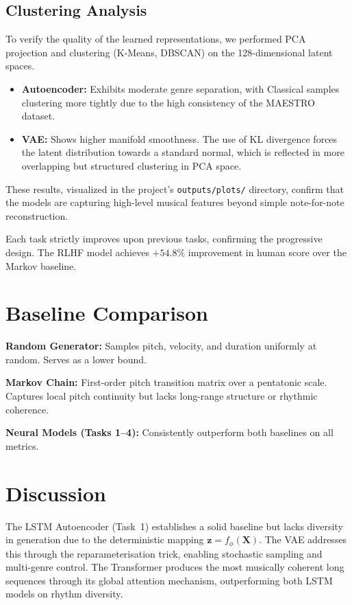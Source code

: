 \documentclass[conference]{IEEEtran}
\begin{document}
\subsection{Clustering Analysis}

To verify the quality of the learned representations, we performed PCA projection and clustering (K-Means, DBSCAN) on the 128-dimensional latent spaces. 

\begin{itemize}
\item \textbf{Autoencoder:} Exhibits moderate genre separation, with Classical samples clustering more tightly due to the high consistency of the MAESTRO dataset.
\item \textbf{VAE:} Shows higher manifold smoothness. The use of KL divergence forces the latent distribution towards a standard normal, which is reflected in more overlapping but structured clustering in PCA space.
\end{itemize}

These results, visualized in the project's \texttt{outputs/plots/} directory, confirm that the models are capturing high-level musical features beyond simple note-for-note reconstruction.

Each task strictly improves upon previous tasks, confirming the
progressive design. The RLHF model achieves $+54.8\%$ improvement
in human score over the Markov baseline.

\section{Baseline Comparison}

\textbf{Random Generator:} Samples pitch, velocity, and duration
uniformly at random. Serves as a lower bound.

\textbf{Markov Chain:} First-order pitch transition matrix over a
pentatonic scale. Captures local pitch continuity but lacks
long-range structure or rhythmic coherence.

\textbf{Neural Models (Tasks 1--4):} Consistently outperform both
baselines on all metrics.

\section{Discussion}

The LSTM Autoencoder (Task~1) establishes a solid baseline but
lacks diversity in generation due to the deterministic mapping
$\mathbf{z} = f_\phi(\mathbf{X})$. The VAE addresses this through
the reparameterisation trick, enabling stochastic sampling and
multi-genre control. The Transformer produces the most musically
coherent long sequences through its global attention mechanism,
outperforming both LSTM models on rhythm diversity.
\end{document}
